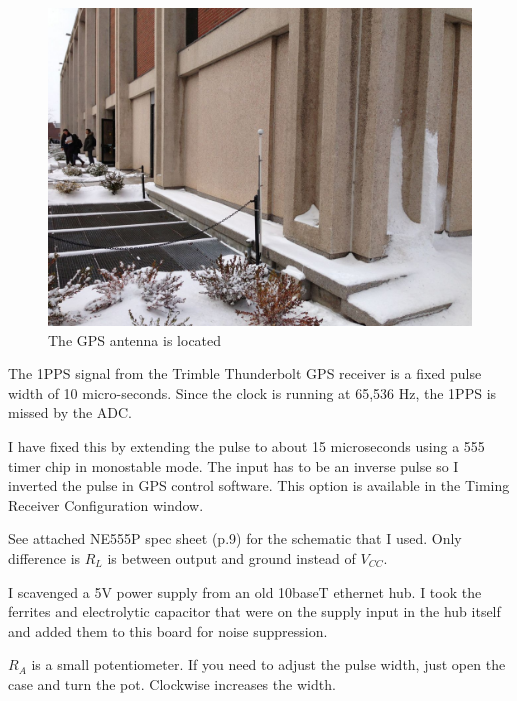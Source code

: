 \begin{figure}[htbp]
	\centering
		\includegraphics[width=15cm]{./figures/IMG_1308.jpg}
	\caption[GPS Antenna Location]{The GPS antenna is located }
	\label{fig:gps_antenna}
\end{figure}

The 1PPS signal from the Trimble Thunderbolt GPS receiver is a fixed pulse width of 10 micro-seconds. Since the clock is running at 65,536 Hz, the 1PPS is missed by the ADC.

I have fixed this by extending the pulse to about 15 microseconds using a 555 timer chip in monostable mode. The input has to be an inverse pulse so I inverted the pulse in GPS control software. This option is available in the Timing Receiver Configuration window.

See attached NE555P spec sheet (p.9) for the schematic that I used. Only difference is $R_L$ is between output and ground instead of $V_{CC}$.

I scavenged a 5V power supply from an old 10baseT ethernet hub. I took the ferrites and electrolytic capacitor that were on the supply input in the hub itself and added them to this board for noise suppression.

$R_A$ is a small potentiometer. If you need to adjust the pulse width, just open the case and turn the pot. Clockwise increases the width.

